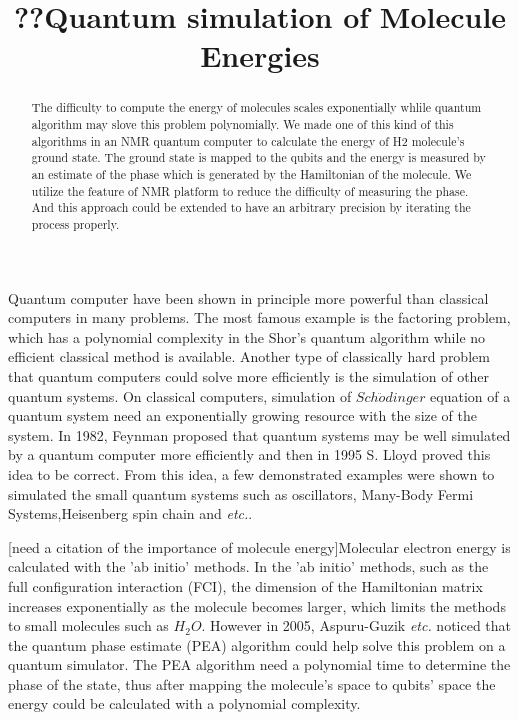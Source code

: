 \documentclass[twocolumn,showpacs,twoside,10pt,superscriptaddress,prl]{revtex4}
\begin{document}
\title{??Quantum simulation of Molecule Energies}


\begin{abstract}
The difficulty to compute the energy of molecules scales
exponentially whlile quantum algorithm may slove this problem
polynomially. We made one of this kind of this algorithms in an NMR
quantum computer to calculate the energy of H2 molecule's ground
state. The ground state is mapped to the qubits and the energy is
measured by an estimate of the phase which is generated by the
Hamiltonian of the molecule. We utilize the feature of NMR platform
to reduce the difficulty of measuring the phase. And this approach
could be extended to have an arbitrary precision by iterating the
process properly.
\end{abstract}
\maketitle

Quantum computer have been shown in principle more powerful than
classical computers in many problems. The most famous example is the
factoring problem, which has a polynomial complexity in the Shor's
quantum algorithm while no efficient classical method is available.
Another type of classically hard problem that quantum computers
could solve more efficiently is the simulation of other quantum
systems. On classical computers, simulation of $Sch\ddot{o}dinger$
equation of a quantum system need an exponentially growing resource
with the size of the system. In 1982, Feynman proposed that quantum
systems may be well simulated by a quantum computer more efficiently
and then in 1995 S. Lloyd proved this idea to be correct. From this
idea, a few demonstrated examples were shown to simulated the small
quantum systems such as oscillators, Many-Body Fermi
Systems,Heisenberg spin chain and \emph{etc.}.



[need a citation of the importance of molecule energy]Molecular
electron energy is calculated with the  'ab initio' methods. In the
'ab initio' methods, such as the full configuration interaction
(FCI), the dimension of the Hamiltonian matrix increases
exponentially as the molecule becomes larger, which limits the
methods to small molecules such as $H_2O$. However in 2005,
Aspuru-Guzik \emph{etc.} noticed that the quantum phase estimate
(PEA) algorithm could help solve this problem on a quantum
simulator. The PEA algorithm need a polynomial time to determine the
phase of the state, thus after mapping the molecule's space to
qubits' space the energy could be calculated with a polynomial
complexity.
\end{document}
